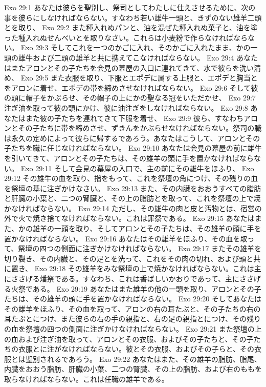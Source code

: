 Exo 29:1  あなたは彼らを聖別し、祭司としてわたしに仕えさせるために、次の事を彼らにしなければならない。すなわち若い雄牛一頭と、きずのない雄羊二頭とを取り、
Exo 29:2  また種入れぬパンと、油を混ぜた種入れぬ菓子と、油を塗った種入れぬせんべいとを取りなさい。これらは小麦粉で作らなければならない。
Exo 29:3  そしてこれを一つのかごに入れ、そのかごに入れたまま、かの一頭の雄牛および二頭の雄羊と共に携えてこなければならない。
Exo 29:4  あなたはまたアロンとその子たちを会見の幕屋の入口に連れてきて、水で彼らを洗い清め、
Exo 29:5  また衣服を取り、下服とエポデに属する上服と、エポデと胸当とをアロンに着せ、エポデの帯を締めさせなければならない。
Exo 29:6  そして彼の頭に帽子をかぶらせ、その帽子の上にかの聖なる冠をいただかせ、
Exo 29:7  注ぎ油を取って彼の頭にかけ、彼に油注ぎをしなければならない。
Exo 29:8  あなたはまた彼の子たちを連れてきて下服を着せ、
Exo 29:9  彼ら、すなわちアロンとその子たちに帯を締めさせ、ずきんをかぶらせなければならない。祭司の職は永久の定めによって彼らに帰するであろう。あなたはこうして、アロンとその子たちを職に任じなければならない。
Exo 29:10  あなたは会見の幕屋の前に雄牛を引いてきて、アロンとその子たちは、その雄羊の頭に手を置かなければならない。
Exo 29:11  そして会見の幕屋の入口で、主の前にその雄牛をほふり、
Exo 29:12  その雄牛の血を取り、指をもって、これを祭壇の角につけ、その残りの血を祭壇の基に注ぎかけなさい。
Exo 29:13  また、その内臓をおおうすべての脂肪と肝臓の小葉と、二つの腎臓と、その上の脂肪とを取って、これを祭壇の上で焼かなければならない。
Exo 29:14  ただし、その雄牛の肉と皮と汚物とは、宿営の外で火で焼き捨てなければならない。これは罪祭である。
Exo 29:15  あなたはまた、かの雄羊の一頭を取り、そしてアロンとその子たちは、その雄羊の頭に手を置かなければならない。
Exo 29:16  あなたはその雄羊をほふり、その血を取って、祭壇の四つの側面に注ぎかけなければならない。
Exo 29:17  またその雄羊を切り裂き、その内臓と、その足とを洗って、これをその肉の切れ、および頭と共に置き、
Exo 29:18  その雄羊をみな祭壇の上で焼かなければならない。これは主にささげる燔祭である。すなわち、これは香ばしいかおりであって、主にささげる火祭である。
Exo 29:19  あなたはまた雄羊の他の一頭を取り、アロンとその子たちは、その雄羊の頭に手を置かなければならない。
Exo 29:20  そしてあなたはその雄羊をほふり、その血を取って、アロンの右の耳たぶと、その子たちの右の耳たぶとにつけ、また彼らの右の手の親指と、右の足の親指とにつけ、その残りの血を祭壇の四つの側面に注ぎかけなければならない。
Exo 29:21  また祭壇の上の血および注ぎ油を取って、アロンとその衣服、およびその子たちと、その子たちの衣服とに注がなければならない。彼とその衣服、およびその子らと、その衣服とは聖別されるであろう。
Exo 29:22  あなたはまた、その雄羊の脂肪、脂尾、内臓をおおう脂肪、肝臓の小葉、二つの腎臓、その上の脂肪、および右のももを取らなければならない。これは任職の雄羊である。
